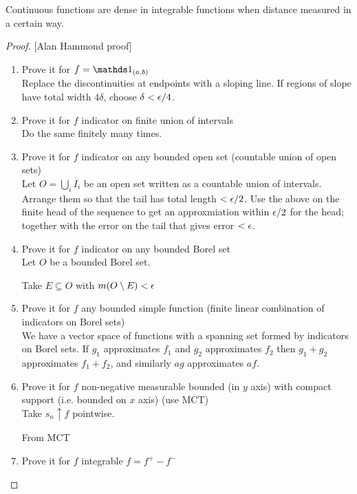 \begin{remark*}
  Continuous functions are dense in integrable functions when distance measured in a certain way.
\end{remark*}

\begin{proof}

  [Alan Hammond proof]

  \begin{enumerate}
  \item Prove it for $f = \ind_{(a, b)}$ \\

    Replace the discontinuities at endpoints with a sloping line. If regions of slope have total
    width $4\delta$, choose $\delta < \epsilon/4$.

  \item Prove it for $f$ indicator on finite union of intervals \\

    Do the same finitely many times.

  \item Prove it for $f$ indicator on any bounded open set (countable union of open sets) \\

    Let $O = \bigcup_i I_i$ be an open set written as a countable union of intervals. Arrange them so that the
    tail has total length $< \epsilon/2$. Use the above on the finite head of the sequence to get an approxmiation
    within $\epsilon/2$ for the head; together with the error on the tail that gives error $< \epsilon$.

  \item Prove it for $f$ indicator on any bounded Borel set \\

    Let $O$ be a bounded Borel set.

    Take $E \subseteq O$ with $m(O \setminus E) < \epsilon$


  \item Prove it for $f$ any bounded simple function (finite linear combination of indicators on Borel sets) \\

    We have a vector space of functions with a spanning set formed by indicators on Borel sets. If $g_1$
    approximates $f_1$ and $g_2$ approximates $f_2$ then $g_1 + g_2$ approximates $f_1 + f_2$, and
    similarly $ag$ approximates $af$.

  \item Prove it for $f$ non-negative measurable bounded (in $y$ axis) with compact support (i.e. bounded on $x$ axis) (use MCT) \\

    Take $s_n \uparrow f$ pointwise.

    From MCT



  \item Prove it for $f$ integrable $f = f^+ - f^-$
  \end{enumerate}
\end{proof}






